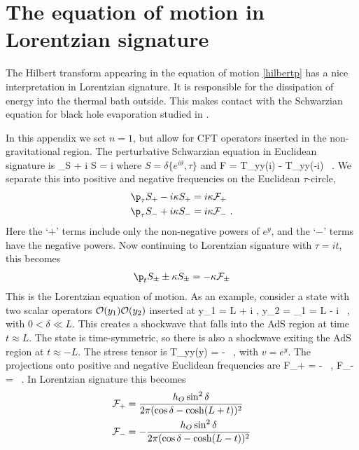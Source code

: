 

\section{The equation of motion in Lorentzian signature}
\label{app:lorentzian}

The Hilbert transform appearing in the equation of motion \eqref{hilbertp} has a nice interpretation in Lorentzian signature. It is responsible for the dissipation of energy into the thermal bath outside. This makes contact with the Schwarzian equation for black hole evaporation studied in \cite{Engelsoy:2016xyb,Almheiri:2019psf}.

In this appendix we set $n=1$, but allow for CFT operators inserted in the non-gravitational region. The perturbative Schwarzian equation in Euclidean signature is
\be
\p_\tau S + i \kappa \Hilbert \cdot S = i 
\ee
where $S = \delta \{e^{i\theta}, \tau\}$ and
\be
{\cal F} =  T_{yy}(i\tau) - T_{yy}(-i\tau)  \ .
\ee
We separate this into positive and negative frequencies on the Euclidean $\tau$-circle,
\begin{align}
\p_\tau S_+ - i  \kappa S_+ &= i \kappa {\cal F}_+ \\
\p_\tau S_- + i  \kappa S_- &=  i\kappa {\cal F}_- \ .
\end{align}
Here the `$+$' terms include only the non-negative powers of $e^y$, and the `$-$' terms have the negative powers.
Now continuing to Lorentzian signature with $\tau = it$, this becomes
\begin{align}\label{lorentzianshock}
\p_t S_\pm \pm \kappa S_\pm = -\kappa {\cal F}_\pm
\end{align}
This is the Lorentzian equation of motion. As an example, consider a state with two scalar operators ${\cal O}(y_1) {\cal O}(y_2)$ inserted at 
\be
y_1 = L + i \delta , \qquad y_2  = \by_1 =  L - i \delta \ ,
\ee
with $0 < \delta \ll L $. This creates a shockwave that falls into the AdS region at time $t \approx L$. The state is time-symmetric, so there is also a shockwave exiting the AdS region at $t \approx -L$.
The stress tensor is 
\be
T_{yy}(y) = -     \ ,
\ee
with $v = e^{y}$. The projections onto positive and negative Euclidean frequencies are
\be
{\cal F}_+ = -    \ , \qquad
{\cal F}_-  =   \ .
\ee
In Lorentzian signature this becomes
\begin{align}
{\cal F}_+ &=  \frac{h_O\sin^2\delta }{2\pi (\cos\delta  - \cosh(L+t))^2} \\
{\cal F}_- &= -\frac{h_O \sin^2\delta }{ 2\pi (\cos\delta - \cosh(L-t))^2 } 
\end{align}
